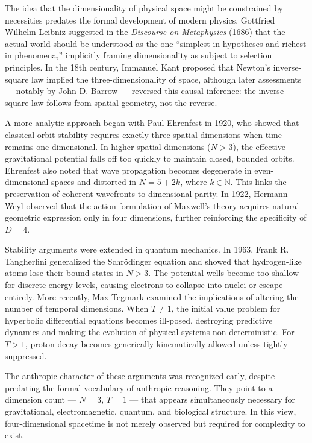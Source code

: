 \begin{historical}
The idea that the dimensionality of physical space might be constrained by necessities predates the formal development of modern physics. Gottfried Wilhelm Leibniz suggested in the \emph{Discourse on Metaphysics} (1686) that the actual world should be understood as the one “simplest in hypotheses and richest in phenomena,” implicitly framing dimensionality as subject to selection principles. In the 18th century, Immanuel Kant proposed that Newton’s inverse-square law implied the three-dimensionality of space, although later assessments — notably by John D. Barrow — reversed this causal inference: the inverse-square law follows from spatial geometry, not the reverse.

A more analytic approach began with Paul Ehrenfest in 1920, who showed that classical orbit stability requires exactly three spatial dimensions when time remains one-dimensional. In higher spatial dimensions ($N > 3$), the effective gravitational potential falls off too quickly to maintain closed, bounded orbits. Ehrenfest also noted that wave propagation becomes degenerate in even-dimensional spaces and distorted in $N = 5 + 2k$, where $k \in \mathbb{N}$. This links the preservation of coherent wavefronts to dimensional parity. In 1922, Hermann Weyl observed that the action formulation of Maxwell’s theory acquires natural geometric expression only in four dimensions, further reinforcing the specificity of $D = 4$.

Stability arguments were extended in quantum mechanics. In 1963, Frank R. Tangherlini generalized the Schrödinger equation and showed that hydrogen-like atoms lose their bound states in $N > 3$. The potential wells become too shallow for discrete energy levels, causing electrons to collapse into nuclei or escape entirely. More recently, Max Tegmark examined the implications of altering the number of temporal dimensions. When $T \ne 1$, the initial value problem for hyperbolic differential equations becomes ill-posed, destroying predictive dynamics and making the evolution of physical systems non-deterministic. For $T > 1$, proton decay becomes generically kinematically allowed unless tightly suppressed.

The anthropic character of these arguments was recognized early, despite predating the formal vocabulary of anthropic reasoning. They point to a dimension count — $N = 3$, $T = 1$ — that appears simultaneously necessary for gravitational, electromagnetic, quantum, and biological structure. In this view, four-dimensional spacetime is not merely observed but required for complexity to exist.


\end{historical}
